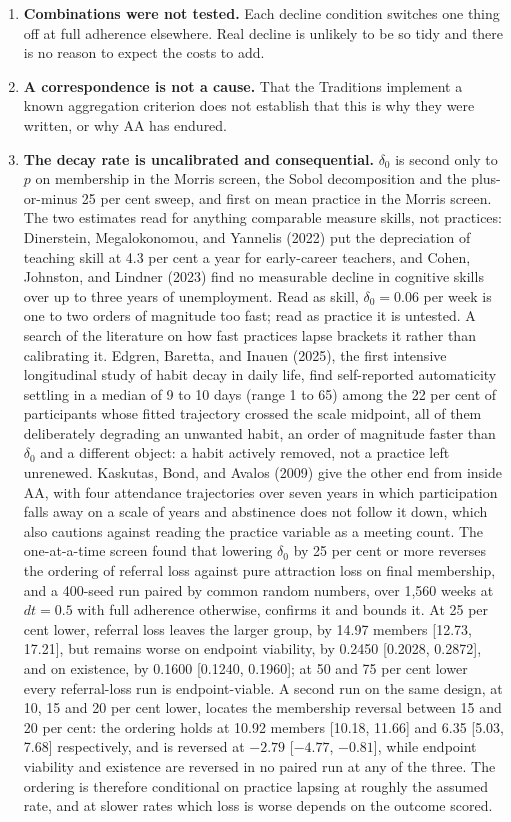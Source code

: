 \documentclass[11pt,a4paper]{article}
\begin{document}
\begin{enumerate}
\item \textbf{Combinations were not tested.} Each decline condition switches one
thing off at full adherence elsewhere. Real decline is unlikely to be so tidy and
there is no reason to expect the costs to add.

\item \textbf{A correspondence is not a cause.} That the Traditions implement a
known aggregation criterion does not establish that this is why they were written,
or why AA has endured.

\item \textbf{The decay rate is uncalibrated and consequential.} $\delta_0$ is second only
to $p$ on membership in the Morris screen, the Sobol decomposition and the
plus-or-minus 25 per cent sweep, and first on mean practice in the Morris screen. The two estimates read for anything comparable measure
skills, not practices: Dinerstein, Megalokonomou, and Yannelis (2022) put the depreciation of
teaching skill at 4.3 per cent a year for early-career teachers, and Cohen, Johnston, and
Lindner (2023) find no measurable decline in cognitive skills over up to three years of
unemployment. Read as skill, $\delta_0 = 0.06$ per week is one to two orders of magnitude too
fast; read as practice it is untested. A search of the literature on how fast practices lapse
brackets it rather than calibrating it. Edgren, Baretta, and Inauen (2025), the first intensive
longitudinal study of habit decay in daily life, find self-reported automaticity settling in a
median of 9 to 10 days (range 1 to 65) among the 22 per cent of participants whose fitted
trajectory crossed the scale midpoint, all of them deliberately degrading an unwanted habit,
an order of magnitude faster than $\delta_0$ and a different object: a habit actively removed,
not a practice left unrenewed. Kaskutas, Bond, and Avalos (2009) give the other end from inside
AA, with four attendance trajectories over seven years in which participation falls away on a
scale of years and abstinence does not follow it down, which also cautions against reading the
practice variable as a meeting count. The one-at-a-time screen found that lowering $\delta_0$
by 25 per cent or more reverses the ordering of referral loss against pure attraction loss on
final membership, and a 400-seed run paired by common random numbers, over 1,560 weeks at
$dt = 0.5$ with full adherence otherwise, confirms it and bounds it. At 25 per cent lower,
referral loss leaves the larger group, by 14.97 members [12.73, 17.21], but remains worse on
endpoint viability, by 0.2450 [0.2028, 0.2872], and on existence, by 0.1600 [0.1240, 0.1960];
at 50 and 75 per cent lower every referral-loss run is endpoint-viable. A second run on the same
design, at 10, 15 and 20 per cent lower, locates the membership reversal between 15 and 20 per
cent: the ordering holds at 10.92 members [10.18, 11.66] and 6.35 [5.03, 7.68] respectively, and
is reversed at $-2.79$ [$-4.77$, $-0.81$], while endpoint viability and existence are reversed in
no paired run at any of the three. The ordering is therefore
conditional on practice lapsing at roughly the assumed rate, and at slower rates which loss is
worse depends on the outcome scored.


\end{enumerate}
\end{document}

